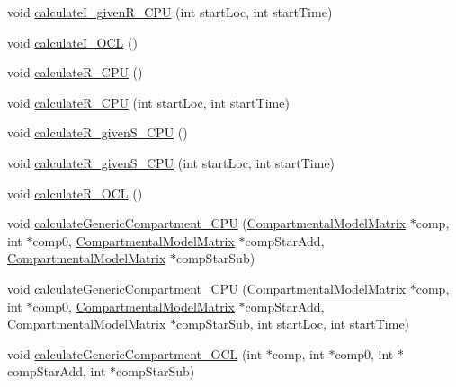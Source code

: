 \begin{DoxyCompactItemize}
\item 
void \hyperlink{classSpatialSEIR_1_1ModelContext_ace5adbd2c049119a6526b77fa6db8abe}{calculate\-I\-\_\-given\-R\-\_\-\-C\-P\-U} (int start\-Loc, int start\-Time)
\item 
void \hyperlink{classSpatialSEIR_1_1ModelContext_a53e9b18996c5e27195ae9fbd6cc159e3}{calculate\-I\-\_\-\-O\-C\-L} ()
\item 
void \hyperlink{classSpatialSEIR_1_1ModelContext_a92f748128f4fa804119358bde45d9495}{calculate\-R\-\_\-\-C\-P\-U} ()
\item 
void \hyperlink{classSpatialSEIR_1_1ModelContext_aefe857c9d21387113bcc97fab8bb6940}{calculate\-R\-\_\-\-C\-P\-U} (int start\-Loc, int start\-Time)
\item 
void \hyperlink{classSpatialSEIR_1_1ModelContext_aa3033268ceb0ea5c5cbb855e3d81db01}{calculate\-R\-\_\-given\-S\-\_\-\-C\-P\-U} ()
\item 
void \hyperlink{classSpatialSEIR_1_1ModelContext_ab837c260a46169c0c4d7c041f09a47ec}{calculate\-R\-\_\-given\-S\-\_\-\-C\-P\-U} (int start\-Loc, int start\-Time)
\item 
void \hyperlink{classSpatialSEIR_1_1ModelContext_a45a46e9c64ccf0b883a6009a282147c5}{calculate\-R\-\_\-\-O\-C\-L} ()
\item 
void \hyperlink{classSpatialSEIR_1_1ModelContext_acfeda1172ab57c9cc5876c23749d86b5}{calculate\-Generic\-Compartment\-\_\-\-C\-P\-U} (\hyperlink{classSpatialSEIR_1_1CompartmentalModelMatrix}{Compartmental\-Model\-Matrix} $\ast$comp, int $\ast$comp0, \hyperlink{classSpatialSEIR_1_1CompartmentalModelMatrix}{Compartmental\-Model\-Matrix} $\ast$comp\-Star\-Add, \hyperlink{classSpatialSEIR_1_1CompartmentalModelMatrix}{Compartmental\-Model\-Matrix} $\ast$comp\-Star\-Sub)
\item 
void \hyperlink{classSpatialSEIR_1_1ModelContext_a5fab8ff5274f269e6b4739bf746df8c1}{calculate\-Generic\-Compartment\-\_\-\-C\-P\-U} (\hyperlink{classSpatialSEIR_1_1CompartmentalModelMatrix}{Compartmental\-Model\-Matrix} $\ast$comp, int $\ast$comp0, \hyperlink{classSpatialSEIR_1_1CompartmentalModelMatrix}{Compartmental\-Model\-Matrix} $\ast$comp\-Star\-Add, \hyperlink{classSpatialSEIR_1_1CompartmentalModelMatrix}{Compartmental\-Model\-Matrix} $\ast$comp\-Star\-Sub, int start\-Loc, int start\-Time)
\item 
void \hyperlink{classSpatialSEIR_1_1ModelContext_a2a73c2d012430c7909176d43b3343f84}{calculate\-Generic\-Compartment\-\_\-\-O\-C\-L} (int $\ast$comp, int $\ast$comp0, int $\ast$comp\-Star\-Add, int $\ast$comp\-Star\-Sub)

\end{DoxyCompactItemize}
